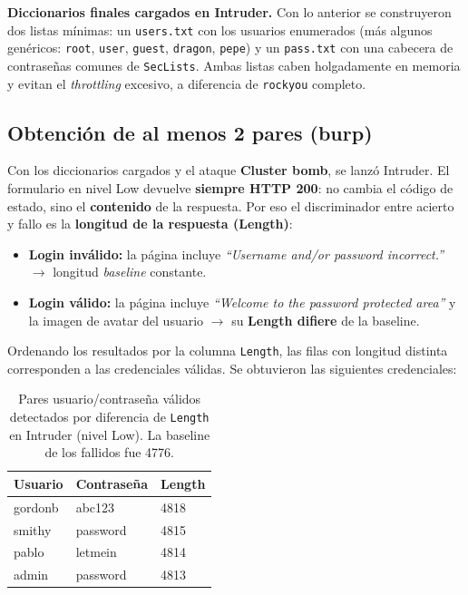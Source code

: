 \documentclass[letter,12pt]{article}
\begin{document}
\textbf{Diccionarios finales cargados en Intruder.} Con lo anterior se construyeron dos listas mínimas: un \texttt{users.txt} con los usuarios enumerados (más algunos genéricos: \texttt{root}, \texttt{user}, \texttt{guest}, \texttt{dragon}, \texttt{pepe})  y un \texttt{pass.txt} con una cabecera de contraseñas comunes de \texttt{SecLists}. Ambas listas caben holgadamente en memoria y evitan el \emph{throttling} excesivo, a diferencia de \texttt{rockyou} completo. \\


\subsection{Obtención de al menos 2 pares (burp)}
Con los diccionarios cargados y el ataque \textbf{Cluster bomb}, se lanzó Intruder. El formulario en nivel Low devuelve \textbf{siempre HTTP 200}: no cambia el código de estado, sino el \textbf{contenido} de la respuesta. Por eso el discriminador entre acierto y fallo es la \textbf{longitud de la respuesta (Length)}: \\


\begin{itemize}
    \item \textbf{Login inválido:} la página incluye \emph{``Username and/or password incorrect.''} $\rightarrow$ longitud \emph{baseline} constante.
    \item \textbf{Login válido:} la página incluye \emph{``Welcome to the password protected area''} y la imagen de avatar del usuario $\rightarrow$ su \textbf{Length difiere} de la baseline.
\end{itemize}

Ordenando los resultados por la columna \texttt{Length}, las filas con longitud distinta corresponden a las credenciales válidas. Se obtuvieron las siguientes credenciales: \\


\begin{table}[H]
\centering
\begin{tabular}{lll}
\hline
\textbf{Usuario} & \textbf{Contraseña} & \textbf{Length} \\
\hline
gordonb & abc123   & 4818 \\
smithy  & password & 4815 \\
pablo   & letmein  & 4814 \\
admin   & password & 4813 \\
\hline
\end{tabular}
\caption{Pares usuario/contraseña válidos detectados por diferencia de \texttt{Length} en Intruder (nivel Low). La baseline de los fallidos fue 4776.}
\label{tab:pares}
\end{table}
\end{document}
